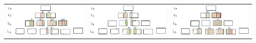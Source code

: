 \begin{table}
    \centering
    \begin{tabular}{ccc}

        \includegraphics[scale=0.30]{Figures/fail-lsm-1.jpg} & 
        \includegraphics[scale=0.30]{Figures/fail-lsm-2.jpg} & 
        \includegraphics[scale=0.30]{Figures/fail-lsm-3.jpg}  



\end{tabular}
\end{table}
